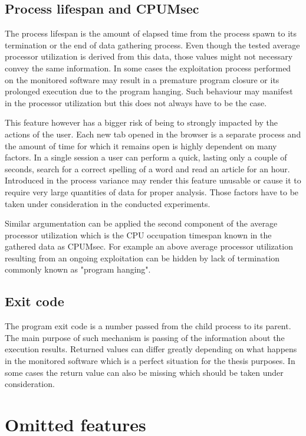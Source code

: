 \documentclass[a4paper,twoside,12pt]{book}
\begin{document}
\subsection{Process lifespan and CPUMsec}

The process lifespan is the amount of elapsed time from the process spawn to its
termination or the end of data gathering process. Even though the tested average processor utilization 
is derived from this data, those values might not necessary convey the same information. In some cases
the exploitation process performed on the monitored software may result in a premature program
closure or its prolonged execution due to the program hanging. Such behaviour may manifest in the
processor utilization but this does not always have to be the case. 

This feature however has a bigger risk of being to strongly impacted by the actions of the user. 
Each new tab opened in the browser is a separate process and the amount of time for which it remains
open is highly dependent on many factors. In a single session a user can perform a quick, lasting 
only a couple of seconds, search for a correct spelling of a word and read an article for 
an hour. Introduced in the process variance may render this feature unusable or cause it to
require very large quantities of data for proper analysis. Those factors have to be taken 
under consideration in the conducted experiments.

Similar argumentation can be applied the second component of the average processor utilization which is
the CPU occupation timespan known in the gathered data as CPUMsec. For example an above average processor utilization
resulting from an ongoing exploitation can be hidden by lack of termination commonly known as "program hanging".

\subsection{Exit code}

The program exit code is a number passed from the child process to its parent. The main purpose 
of such mechanism is passing of the information about the execution results. Returned values
can differ greatly depending on what happens in the monitored software which is a perfect situation
for the thesis purposes. In some cases the return value can also be missing which should be taken 
under consideration.

\section{Omitted features}
\end{document}
